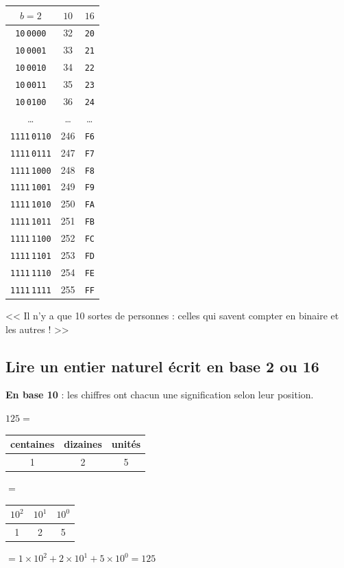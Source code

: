 \begin{multicols}{3}
\begin{tabular}{ccc}
$b=2$ &  $10$ & $16$ \\
\hline
\texttt{10}\,\texttt{0000} & 32 & \texttt{20} \\
\texttt{10}\,\texttt{0001} & 33 & \texttt{21} \\
\texttt{10}\,\texttt{0010} & 34 & \texttt{22} \\
\texttt{10}\,\texttt{0011} & 35 & \texttt{23} \\
\texttt{10}\,\texttt{0100} & 36 & \texttt{24} \\
\ldots & \ldots & \ldots \\
\texttt{1111}\,\texttt{0110} & 246 & \texttt{F6} \\
\texttt{1111}\,\texttt{0111} & 247 & \texttt{F7} \\
\texttt{1111}\,\texttt{1000} & 248 & \texttt{F8} \\
\texttt{1111}\,\texttt{1001} & 249 & \texttt{F9} \\
\texttt{1111}\,\texttt{1010} & 250 & \texttt{FA} \\
\texttt{1111}\,\texttt{1011} & 251 & \texttt{FB} \\
\texttt{1111}\,\texttt{1100} & 252 & \texttt{FC} \\
\texttt{1111}\,\texttt{1101} & 253 & \texttt{FD} \\
\texttt{1111}\,\texttt{1110} & 254 & \texttt{FE} \\
\texttt{1111}\,\texttt{1111} & 255 & \texttt{FF} \\
\end{tabular}
\end{multicols}

\begin{center}
<< Il n'y a que 10 sortes de personnes : celles qui savent compter en binaire et les autres ! >>
\end{center}

\subsection{Lire un entier naturel écrit en base 2 ou 16}

{\bfseries En base 10} : les chiffres ont chacun une signification selon leur position. 

$125 =$
\begin{tabular}{ccc}
centaines & dizaines & unités \\
\hline
1 & 2 & 5\\
\end{tabular}$=$\begin{tabular}{ccc}
$10^2$ & $10^1$ & $10^0$ \\
\hline
1 & 2 & 5\\
\end{tabular} $=1\times10^2+2\times10^1+5\times10^0=125$

